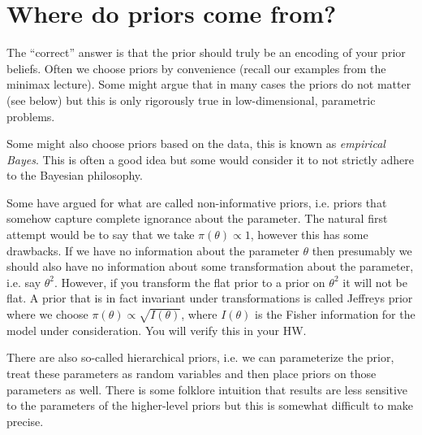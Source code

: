 \documentclass[twoside,12pt]{article}
\begin{document}
\section{Where do priors come from?}
The ``correct'' answer is that the prior should truly be an encoding of your prior beliefs. Often we choose priors by convenience (recall our examples from the minimax lecture). Some might argue that in many cases the priors do not matter (see below) but this is only rigorously true in low-dimensional, parametric problems.

Some might also choose priors based on the data, this is known as \emph{empirical Bayes}. This is often a good idea but some would consider it to not strictly adhere to the Bayesian philosophy.

Some have argued for what are called non-informative priors, i.e. priors that somehow capture complete ignorance about the parameter. The natural first attempt would be to say that we take $\pi(\theta) \propto 1$, however this has some drawbacks. If we have no information about the parameter $\theta$ then presumably we should also have no information about some transformation about the parameter, i.e. say $\theta^2$. However, if you transform the flat prior to a prior on $\theta^2$ it will not be flat. A prior that is in fact invariant under transformations is called Jeffreys prior where we choose $\pi(\theta) \propto \sqrt{ I(\theta)}$, where $I(\theta)$ is the Fisher information for the model under consideration. You will verify this in your HW.

There are also so-called hierarchical priors, i.e. we can parameterize the prior, treat these parameters as random variables and then place priors on those parameters as well. There is some folklore intuition that results are less sensitive to the parameters of the higher-level priors but this is somewhat difficult to make precise.
\end{document}
